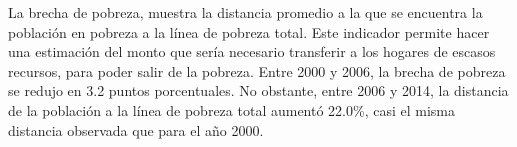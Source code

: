 La brecha de pobreza, muestra la distancia promedio a la que se encuentra la población en pobreza a la línea de pobreza total. Este indicador permite hacer una estimación del monto que sería necesario transferir a los hogares de escasos recursos, para poder salir de la pobreza.   Entre 2000 y 2006, la brecha de pobreza se redujo en 3.2 puntos porcentuales. No obstante, entre 2006 y 2014, la distancia de la población a la línea de pobreza total aumentó 22.0\%, casi el misma distancia observada que para el año 2000.